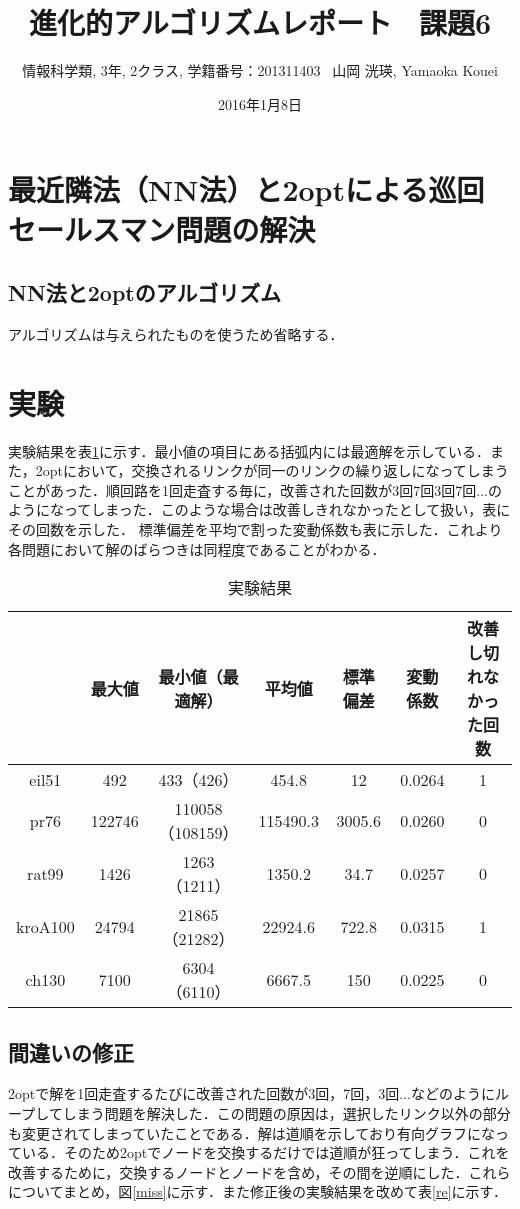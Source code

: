 \documentclass[a4j]{jarticle}
\title{進化的アルゴリズムレポート \ 課題6}
\author{情報科学類, 3年, 2クラス, 学籍番号：201311403 \ 山岡 洸瑛, Yamaoka
Kouei}
\date{2016年1月8日}
\begin{document}
\maketitle
\section*{最近隣法（NN法）と2optによる巡回セールスマン問題の解決}
\subsection*{NN法と2optのアルゴリズム}
アルゴリズムは与えられたものを使うため省略する．
\section*{実験}
実験結果を表\ref{result}に示す．最小値の項目にある括弧内には最適解を示している．また，2optにおいて，交換されるリンクが同一のリンクの繰り返しになってしまうことがあった．順回路を1回走査する毎に，改善された回数が3回7回3回7回...のようになってしまった．このような場合は改善しきれなかったとして扱い，表にその回数を示した．
標準偏差を平均で割った変動係数も表に示した．これより各問題において解のばらつきは同程度であることがわかる．
\begin{table}[H]
 \begin{center}
  \caption{実験結果}
  \label{result}
  \begin{tabular}[tb]{|c|c|c|c|c|c|c|} \hline
   & 最大値 & 最小値（最適解） & 平均値 & 標準偏差 & 変動係数 & 改善し切れなかった回数 \\ \hline
   eil51 & 492 & 433（426） & 454.8 & 12 & 0.0264 & 1 \\ \hline
   pr76 & 122746 & 110058（108159） & 115490.3 & 3005.6 & 0.0260 & 0 \\ \hline
   rat99 & 1426 & 1263（1211） & 1350.2 & 34.7 & 0.0257 & 0 \\ \hline
   kroA100 & 24794 & 21865（21282） & 22924.6 & 722.8 & 0.0315 & 1 \\ \hline
   ch130 & 7100 & 6304（6110） & 6667.5 & 150 & 0.0225 & 0 \\ \hline
  \end{tabular}
 \end{center}
\end{table}

\subsection*{間違いの修正}
2optで解を1回走査するたびに改善された回数が3回，7回，3回...などのようにループしてしまう問題を解決した．この問題の原因は，選択したリンク以外の部分も変更されてしまっていたことである．解は道順を示しており有向グラフになっている．そのため2optでノードを交換するだけでは道順が狂ってしまう．これを改善するために，交換するノードとノードを含め，その間を逆順にした．これらについてまとめ，図\ref{miss}に示す．また修正後の実験結果を改めて表\ref{re}に示す．
\end{document}
